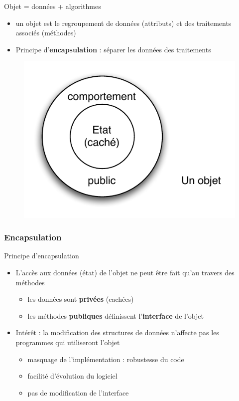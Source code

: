 \begin{frame}{Objet = données + algorithmes}
\begin{itemize}
	\item un objet est le regroupement de données (attributs) et des traitements associés (méthodes)
	\item Principe d'\textbf{encapsulation} : séparer les données des traitements
\end{itemize}
  \begin{figure}[htbp]
    \begin{center}
      \includegraphics[scale=.5]{fig/encapsulation.pdf}
    \end{center}
  \end{figure}
\end{frame}

\subsubsection*{Encapsulation}

\begin{frame}{Principe d'encapsulation}
\begin{itemize}
	\item L'accès aux données (état) de l'objet ne peut être fait qu'au travers des méthodes
	\begin{itemize}
		\item les données sont \textbf{privées} (cachées)
		\item les méthodes \textbf{publiques} définissent l'\textbf{interface} de l'objet
	\end{itemize}
	\item Intérêt : la modification des structures de données n'affecte pas les programmes qui utiliseront l'objet
	\begin{itemize}
		\item masquage de l'implémentation : robustesse du code
		\item facilité d'évolution du logiciel
		\item pas de modification de l'interface
	\end{itemize}
\end{itemize}
\end{frame}

